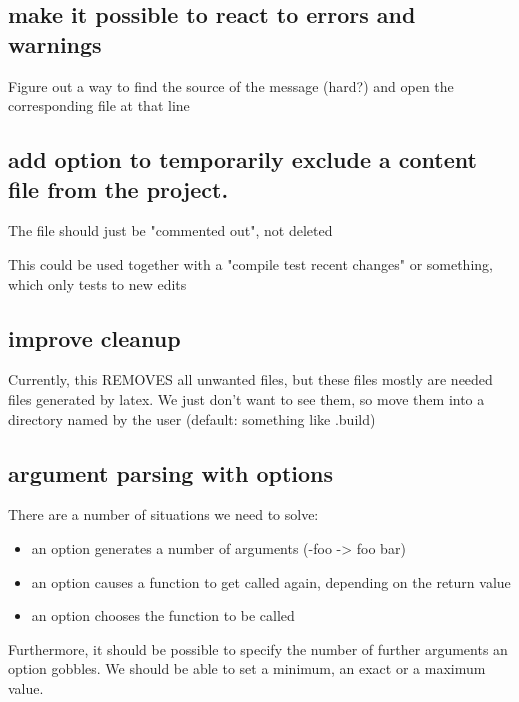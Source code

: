 \documentclass[parskip=half]{scrartcl}
\begin{document}
    \subsection{make it possible to react to errors and warnings}
    Figure out a way to find the source of the message (hard?) and open the corresponding file at that line

    \subsection{add option to temporarily exclude a content file from the project. }
    The file should just be "commented out", not deleted

    This could be used together with a "compile test recent changes" or something, which only tests to new edits

    \subsection{improve cleanup }
    Currently, this REMOVES all unwanted files, but these files mostly are needed files generated by latex. We just don't want to see them, so move them into
    a directory named by the user (default: something like .build)

    \subsection{argument parsing with options}
    There are a number of situations we need to solve:
    \begin{itemize}
      \item an option generates a number of arguments (-foo -> foo bar)
      \item an option causes a function to get called again, depending on the return value
      \item an option chooses the function to be called
    \end{itemize}
    Furthermore, it should be possible to specify the number of further arguments an option gobbles. We should be able to set a minimum, an exact or a maximum
    value.
\end{document}
